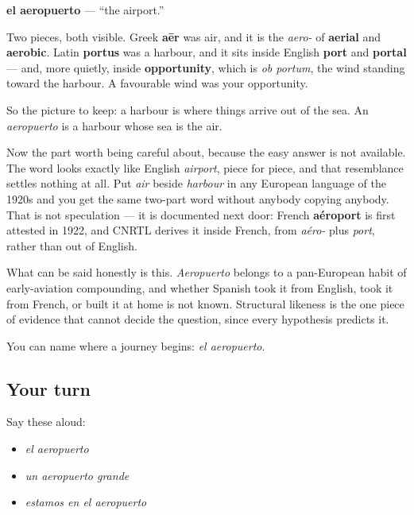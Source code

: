 \begin{cousinweb}
\textbf{el aeropuerto} — \textquotedblleft{}the airport.\textquotedblright{}

Two pieces, both visible. Greek \textbf{aēr} was air, and it is the \emph{aero-} of \textbf{aerial} and \textbf{aerobic}. Latin \textbf{portus} was a harbour, and it sits inside English \textbf{port} and \textbf{portal} — and, more quietly, inside \textbf{opportunity}, which is \emph{ob portum}, the wind standing toward the harbour. A favourable wind was your opportunity.

So the picture to keep: a harbour is where things arrive out of the sea. An \emph{aeropuerto} is a harbour whose sea is the air.

Now the part worth being careful about, because the easy answer is not available. The word looks exactly like English \emph{airport}, piece for piece, and that resemblance settles nothing at all. Put \emph{air} beside \emph{harbour} in any European language of the 1920s and you get the same two-part word without anybody copying anybody. That is not speculation — it is documented next door: French \textbf{aéroport} is first attested in 1922, and CNRTL derives it inside French, from \emph{aéro-} plus \emph{port}, rather than out of English.

What can be said honestly is this. \emph{Aeropuerto} belongs to a pan-European habit of early-aviation compounding, and whether Spanish took it from English, took it from French, or built it at home is not known. Structural likeness is the one piece of evidence that cannot decide the question, since every hypothesis predicts it.
\end{cousinweb}

\begin{grammarlens}[title={What you've built}]
You can name where a journey begins: \emph{el aeropuerto}.
\end{grammarlens}

\subsection*{Your turn}
Say these aloud:

\begin{itemize}
\raggedright
  \item \emph{el aeropuerto}
  \item \emph{un aeropuerto grande}
  \item \emph{estamos en el aeropuerto}
\end{itemize}

